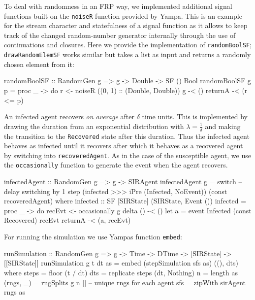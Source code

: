 To deal with randomness in an FRP way, we implemented additional signal functions built on the \texttt{noiseR} function provided by Yampa. This is an example for the stream character and statefulness of a signal function as it allows to keep track of the changed random-number generator internally through the use of continuations and closures. Here we provide the implementation of \texttt{randomBoolSF}; \texttt{drawRandomElemSF} works similar but takes a list as input and returns a randomly chosen element from it:

\begin{HaskellCode}
randomBoolSF :: RandomGen g => g -> Double -> SF () Bool
randomBoolSF g p = proc _ -> do
  r <- noiseR ((0, 1) :: (Double, Double)) g -< ()
  returnA -< (r <= p)
\end{HaskellCode}

An infected agent recovers \textit{on average} after $\delta$ time units. This is implemented by drawing the duration from an exponential distribution \cite{borshchev_system_2004} with $\lambda = \frac{1}{\delta}$ and making the transition to the \texttt{Recovered} state after this duration. Thus the infected agent behaves as infected until it recovers after which it behaves as a recovered agent by switching into \texttt{recoveredAgent}. As in the case of the susceptible agent, we use the \texttt{occasionally} function to generate the event when the agent recovers. %

\begin{HaskellCode}
infectedAgent :: RandomGen g => g -> SIRAgent
infectedAgent g 
    = switch 
      -- delay switching by 1 step 
      (infected >>> iPre (Infected, NoEvent))
      (const recoveredAgent)
  where
    infected :: SF [SIRState] (SIRState, Event ())
    infected = proc _ -> do
      recEvt <- occasionally g delta () -< ()
      let a = event Infected (const Recovered) recEvt
      returnA -< (a, recEvt)
\end{HaskellCode}

For running the simulation we use Yampas function \texttt{embed}:

\begin{HaskellCode}
runSimulation :: RandomGen g => g -> Time -> DTime -> [SIRState] -> [[SIRState]]
runSimulation g t dt as 
    = embed (stepSimulation sfs as) ((), dts)
  where
    steps     = floor (t / dt)
    dts       = replicate steps (dt, Nothing)
    n         = length as
    (rngs, _) = rngSplits g n [] -- unique rngs for each agent
    sfs       = zipWith sirAgent rngs as
\end{HaskellCode}

